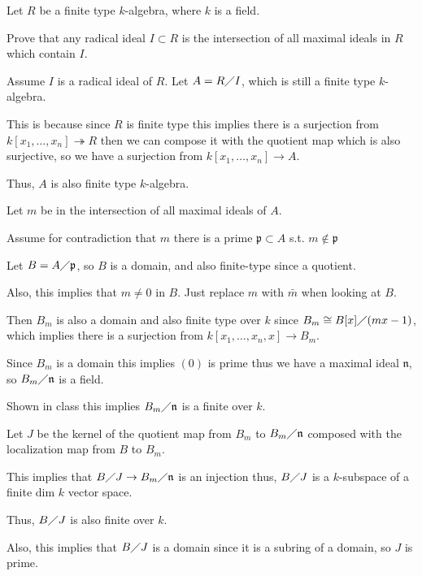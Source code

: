 \documentclass[12pt, letterpaper]{article}
\newcommand{\p}{\mathfrak{p}}
\newcommand{\mf}[1]{\mathfrak{#1}}
\begin{document}
\begin{problem}{}
    Let $R$ be a finite type $k$-algebra, where $k$ is a field.
\end{problem}
\begin{subproblem}{}
Prove that any radical ideal $I \subset R$ is the intersection of all maximal ideals in $R$ which
contain $I$.    
\end{subproblem}
\begin{problemproof}
    Assume $I$ is a radical ideal of $R$. Let $A = R \diagup I$, which is still a finite type $k$-algebra.

    This is because since $R$ is finite type this implies there is a surjection from $k[x_1,\dots,x_n] \twoheadrightarrow R$ then we can compose it with the quotient map which is also surjective, so we have a surjection from $k[x_1,\dots,x_n] \to A$.

    Thus, $A$ is also finite type $k$-algebra.

    Let $m$ be in the intersection of all maximal ideals of $A$.

    Assume for contradiction that $m$ there is a prime $\p \subset A$ s.t. $m \notin \p$

    Let $B=A \diagup \p$, so $B$ is a domain, and also finite-type since a quotient.

    Also, this implies that $m \neq 0$ in $B$. Just replace $m$ with $\bar{m}$ when looking at $B$.

    Then $B_m$ is also a domain and also finite type over $k$ since $B_m \cong B[x] \diagup (mx-1)$, which implies there is a surjection from $k[x_1,\dots,x_n,x] \to B_m$.

    Since $B_m$ is a domain this implies $(0)$ is prime thus we have a maximal ideal $\mf{n}$, so $B_m \diagup \mf{n}$ is a field.

    Shown in class this implies $B_m \diagup \mf{n}$ is a finite over $k$.

    Let $J$ be the kernel of the quotient map from $B_m$ to $B_m \diagup \mf{n}$ composed with the localization map from $B$ to $B_m$.

    This implies that $B \diagup J \to B_m \diagup \mf{n}$ is an injection thus, $B \diagup J$ is a $k$-subspace of a finite dim $k$ vector space.

    Thus, $B \diagup J$ is also finite over $k$.
    
    Also, this implies that $B \diagup J$ is a domain since it is a subring of a domain, so $J$ is prime.


\end{problemproof}
\end{document}

